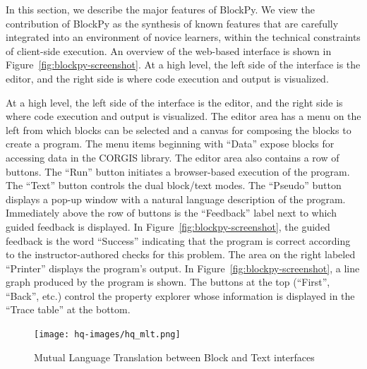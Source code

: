 \documentclass[10pt,journal,compsoc]{IEEEtran}
\begin{document}
In this section, we describe the major features of BlockPy.
We view the contribution of BlockPy as the synthesis of known features that are carefully integrated into an environment of novice learners, within the technical constraints of client-side execution.
An overview of the web-based interface is shown in Figure~\ref{fig:blockpy-screenshot}.
At a high level, the left side of the interface is the editor, and the right side is where code execution and output is visualized.

At a high level, the left side of the interface is the editor, and the right side is where code execution and output is visualized. The editor area has a menu on the left from which blocks can be selected and a canvas for composing the blocks to create a program. The menu items beginning with ``Data'' expose blocks for accessing data in the CORGIS library. The editor area also contains a row of buttons. The ``Run'' button initiates a browser-based execution of the program. The ``Text'' button controls the dual block/text modes. The ``Pseudo'' button displays a pop-up window with a natural language description of the program. Immediately above the row of buttons is the ``Feedback'' label next to which guided feedback is displayed. In Figure~\ref{fig:blockpy-screenshot}, the guided feedback is the word ``Success'' indicating that the program is correct according to the instructor-authored checks for this problem. The area on the right labeled ``Printer'' displays the program's output. In Figure~\ref{fig:blockpy-screenshot}, a line graph produced by the program is shown. The buttons at the top (``First'', ``Back'', etc.) control the property explorer whose information is displayed in the ``Trace table'' at the bottom.

\begin{figure}[h]
    \centering
    \texttt{[image: hq-images/hq\_mlt.png]}
    \vspace{-\bigskipamount}
	\vspace{-\bigskipamount}
    \caption{Mutual Language Translation between Block and Text interfaces}
    \label{fig:blockpy-mlt}
    \vspace{-\medskipamount}
\end{figure}
\end{document}
